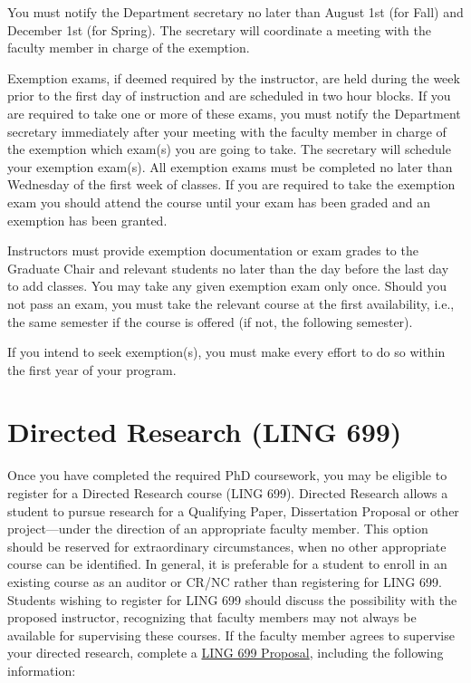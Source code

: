 \documentclass[
]{book}
\begin{document}
You must notify the Department secretary no later than August 1st (for Fall) and December 1st (for Spring). The secretary will coordinate a meeting with the faculty member in charge of the exemption.

Exemption exams, if deemed required by the instructor, are held during the week prior to the first day of instruction and are scheduled in two hour blocks. If you are required to take one or more of these exams, you must notify the Department secretary immediately after your meeting with the faculty member in charge of the exemption which exam(s) you are going to take. The secretary will schedule your exemption exam(s). All exemption exams must be completed no later than Wednesday of the first week of classes. If you are required to take the exemption exam you should attend the course until your exam has been graded and an exemption has been granted.

Instructors must provide exemption documentation or exam grades to the Graduate Chair and relevant students no later than the day before the last day to add classes. You may take any given exemption exam only once. Should you not pass an exam, you must take the relevant course at the first availability, i.e., the same semester if the course is offered (if not, the following semester).

If you intend to seek exemption(s), you must make every effort to do so within the first year of your program.

\section{Directed Research (LING 699)}\label{ling699}

Once you have completed the required PhD coursework, you may be eligible to register for a Directed Research course (LING 699). Directed Research allows a student to pursue research for a Qualifying Paper, Dissertation Proposal or other project---under the direction of an appropriate faculty member. This option should be reserved for extraordinary circumstances, when no other appropriate course can be identified. In general, it is preferable for a student to enroll in an existing course as an auditor or CR/NC rather than registering for LING 699. Students wishing to register for LING 699 should discuss the possibility with the proposed instructor, recognizing that faculty members may not always be available for supervising these courses. If the faculty member agrees to supervise your directed research, complete a \href{files/699form.pdf}{LING 699 Proposal}, including the following information:
\end{document}
